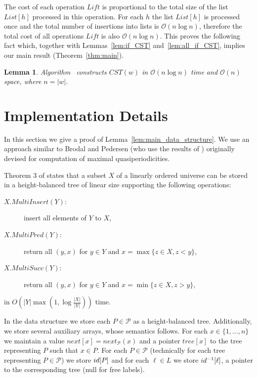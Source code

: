 \documentclass{article}
\theoremstyle{theorem}
\newtheorem{lemma}{Lemma}
\theoremstyle{definition}
\newcommand{\CST}{\mathit{CST}}
\renewcommand{\next}{\mathit{next}}
\newcommand{\tree}{\mathit{tree}}
\newcommand{\Oh}{\mathcal{O}}
\newcommand{\Lift}{\mathit{Lift}}
\newcommand{\List}{\mathit{List}}
\newcommand{\MultiInsert}{\mathit{MultiInsert}}
\newcommand{\MultiPred}{\mathit{MultiPred}}
\newcommand{\MultiSucc}{\mathit{MultiSucc}}
\newcommand{\PP}{\mathcal{P}}
\begin{document}
    The cost of each operation $\Lift$ is proportional to the total size of
    the list $\List[h]$ processed in this operation.
    For each $h$ the list $\List[h]$ is processed once and
    the total number of insertions into lists is $\Oh(n\log n)$,
    therefore the total cost of all operations $\Lift$ is also $\Oh(n\log n)$.
    This proves the following fact which, together with Lemmas~\ref{lem:if_CST} and~\ref{lem:all_if_CST},
    implies our main result (Theorem~\ref{thm:main}).
    

    \begin{lemma}
      Algorithm \algname~constructs $\CST(w)$ in $\Oh(n\log n)$ time and $\Oh(n)$ space, where $n=|w|$.
    \end{lemma}


  \section{Implementation Details}\label{sec:details}
  In this section we give a proof of Lemma~\ref{lem:main_data_structure}.  
  We use an approach similar to Brodal and Pedersen \cite{DBLP:conf/cpm/BrodalP00}
  (who use the results of \cite{DBLP:journals/jacm/BrownT79})
  originally devised for computation of maximal quasiperiodicities.

  Theorem 3 of \cite{DBLP:conf/cpm/BrodalP00} states that
  a subset $X$ of a linearly ordered universe can be stored in a height-balanced
  tree of linear size supporting the following operations:
  \begin{description}
    \item[\quad $X.\MultiInsert(Y)$:] insert all elements of $Y$ to $X$,
    \item[\quad $X.\MultiPred(Y)$:] return all $(y,x)$ for $y\in Y$ and $x=\max\{z\in X, z<y\}$,
    \item[\quad $X.\MultiSucc(Y)$:] return all $(y,x)$ for $y\in Y$ and $x=\min\{z\in X, z>y\}$,
  \end{description}
  in $O\left(|Y|\max\left(1, \log\frac{|X|}{|Y|}\right)\right)$ time.

  \smallskip

  In the data structure we store each $P\in \PP$ as a height-balanced tree.
  Additionally, we store several auxiliary arrays, whose semantics follows.
  For each $x\in \{1,\ldots,n\}$ we maintain a value $\next[x]=\next_\PP(x)$
  and a pointer $\tree[x]$ to the tree representing $P$ such that $x\in P$.
  For each $P\in \PP$ (technically for each tree representing $P\in \PP$) we
  store $id[P]$ and for each $\ell\in L$ we store $id^{-1}[\ell]$, a pointer to the
  corresponding tree (null for free labels).
\end{document}
